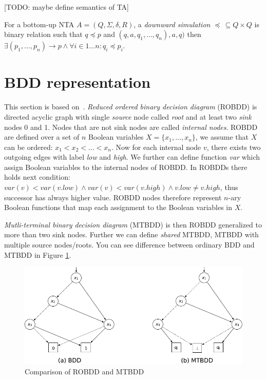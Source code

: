 \documentclass[a4paper, 12pt]{article}
\begin{document}
[TODO: maybe define semantics of TA]


For a bottom-up NTA $A=(Q, \Sigma, \delta, R)$, a \emph{downward simulation} $\preceq\, \subseteq Q\times Q$ is binary relation such that $q \preceq p$
and $(q,a,q_1,\ldots, q_n),a,q)$ then $\exists (p_1, \ldots, p_n) \rightarrow p \wedge \forall i \in {1 \ldots n}: q_i \preceq p_i$.

\section{BDD representation}
\label{sec:bdd}

This section is based on~\cite{fiedor:wsks}. \textit{Reduced ordered binary decision diagram} (ROBDD) is directed acyclic graph with single \textit{source} node called \textit{root} and at least two \textit{sink} nodes 0 and 1. Nodes that are not sink nodes are called \textit{internal nodes}. ROBDD are defined over a set of $n$ Boolean variables $X = \{x_1, \dots, x_n\}$, we assume that $X$ can be ordered: $x_1 < x_2 < \dots < x_n$. Now for each internal node $v$, there exists two outgoing edges with label \textit{low} and \textit{high}. We further can define function \textit{var} which assign Boolean variables to the internal nodes of ROBDD. In ROBDDs there holds next condition: $var(v) < var(v.low) \wedge var(v) < var(v.high) \wedge v.low \neq v.high$, thus successor has always higher value. ROBDD nodes therefore represent $n$-ary Boolean functions that map each assignment to the Boolean variables in $X$.

\textit{Mutli-terminal binary decision diagram} (MTBDD) is then ROBDD generalized to more than two sink nodes. Further we can define \textit{shared} MTBDD, MTBDD with multiple source nodes/roots. You can see difference between ordinary BDD and MTBDD in Figure \ref{fig:15860}.

\begin{figure}[h]
	\centering
	\includegraphics[width=0.7\linewidth]{15860.pdf}
	\caption{Comparison of ROBDD and MTBDD \cite{fiedor:wsks}}
	\label{fig:15860}
\end{figure}
\end{document}
